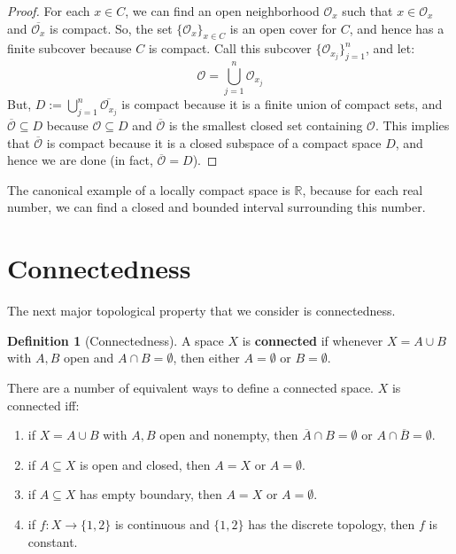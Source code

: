 \documentclass[11pt, oneside]{amsart}   	%
\theoremstyle{definition}
\newtheorem{definition}{Definition}[section]
\begin{document}
	\begin{proof}
		For each $x\in C$, we can find an open neighborhood $\mathcal O_x$ such that $x\in\mathcal O_x$ and 
		$\overline{\mathcal O_x}$ is compact. So, the set $\{\mathcal O_x\}_{x\in C}$ is an open cover for $C$, and 
		hence has a finite subcover because $C$ is compact. Call this subcover $\{\mathcal O_{x_j}\}_{j = 1}^n$, and 
		let:
		$$
			\mathcal O = \bigcup_{j = 1}^n\mathcal O_{x_j}
		$$
		But, $ D := \bigcup_{j = 1}^n\overline{\mathcal O_{x_j}}$ is compact because it is a finite union of compact sets, 
		and $\overline{\mathcal O}\subseteq D$ because $\mathcal O\subseteq D$ and $\overline{\mathcal O}$ is the 
		smallest closed set containing $\mathcal O$. This implies that $\overline{\mathcal O}$ is compact because it 
		is a closed subspace of a compact space $D$, and hence we are done (in fact, $\overline{\mathcal O} = D$).
	\end{proof}
	
	The canonical example of a locally compact space is $\mathbb R$, because for each real number, we can find a 
	closed and bounded interval surrounding this number.

\newpage
	
\section{Connectedness}
	
	The next major topological property that we consider is connectedness. 
	
	\begin{definition}[Connectedness]
		A space $X$ is \textbf{connected} if whenever $X = A\cup B$ with $A, B$ open and $A\cap B = \emptyset$, then 
		either $A = \emptyset$ or $B = \emptyset$. 
	\end{definition}
	
	There are a number of equivalent ways to define a connected space. $X$ is connected iff:
	\begin{enumerate}
		\item if $X = A\cup B$ with $A, B$ open and nonempty, then $\overline A\cap B = \emptyset$ or $A\cap\overline B = 
			\emptyset$. 
		\item if $A\subseteq X$ is open and closed, then $A = X$ or $A = \emptyset$. 
		\item if $A\subseteq X$ has empty boundary, then $A = X$ or $A = \emptyset$. 
		\item if $f : X\rightarrow \{1, 2\}$ is continuous and $\{1, 2\}$ has the discrete topology, then $f$ is constant.
	\end{enumerate}
	
\end{document}
